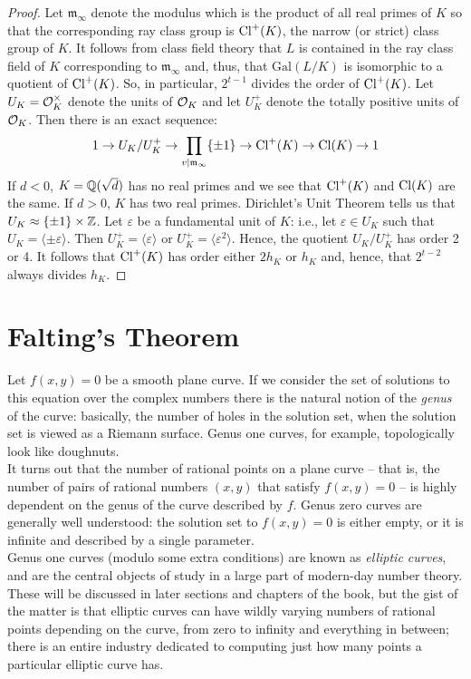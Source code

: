 \documentclass{book}
\begin{document}
\begin{proof}
Let $\mathfrak{m}_{\infty}$ denote the modulus which is the product of all
real primes of $K$ so that the corresponding ray class group is $\operatorname{Cl}^+(K)$,
the narrow (or strict) class group of $K$.  It follows from class field
theory that $L$ is contained in the ray class field of $K$ corresponding to
$\mathfrak{m}_\infty$ and, thus, that $\mathrm{Gal}(L/K)$ is isomorphic to a
quotient of $\operatorname{Cl}^+(K)$.  So, in particular, $2^{t-1}$ divides the order of
$\operatorname{Cl}^+(K)$.  Let $U_K = \mathcal{O}_K^\times$ denote the units of $\mathcal{O}_K$ and let
$U_K^+$ denote the totally positive units of $\mathcal{O}_K$.  Then there is an exact
sequence:
$$
1 \rightarrow U_K/U_K^+ \rightarrow \prod_{v|\mathfrak{m}_\infty} \{\pm 1\}
\rightarrow \operatorname{Cl}^+(K) \rightarrow \operatorname{Cl}(K) \rightarrow 1
$$
If $d < 0$, $K = \mathbb{Q}(\sqrt{d})$ has no real primes and we see that $\operatorname{Cl}^+(K)$
and $\operatorname{Cl}(K)$ are the same.  If $d > 0$, $K$ has two real primes.
Dirichlet's Unit Theorem tells us that $U_K \approx \{\pm 1\} \times \mathbb{Z}$.
Let $\varepsilon$ be a fundamental unit of $K$: i.e., let $\varepsilon \in
U_K$ such that $U_K = \langle\pm \varepsilon\rangle$.  Then $U_K^+ = \langle
\varepsilon\rangle$ or $U_K^+ = \langle\varepsilon^2\rangle$.  Hence, the
quotient $U_K/U_K^+$ has order 2 or 4.  It follows that $\operatorname{Cl}^+(K)$ has order
either $2h_K$ or $h_K$ and, hence, that $2^{t-2}$ always divides $h_K$.
\end{proof}

\section{Falting's Theorem}\label{sec:faltings}
Let $f(x,y)=0$ be a smooth plane curve. If we
consider the set of solutions to this equation over
the complex numbers there is the natural notion of
the {\it genus} of the curve: basically, the number
of holes in the solution set, when the solution set
is viewed as a Riemann surface. Genus one curves, for
example, topologically look like doughnuts. \\

It turns out that the number of rational points on a
plane curve -- that is, the number of pairs of
rational numbers $(x,y)$ that satisfy $f(x,y)=0$ --
is highly dependent on the genus of the curve
described by $f$. Genus zero curves are generally
well understood: the solution set to $f(x,y)=0$ is
either empty, or it is infinite and described by a
single parameter. \\

Genus one curves (modulo some extra conditions) are
known as {\it elliptic curves}, and are the central
objects of study in a large part of modern-day number
theory. These will be discussed in later sections and
chapters of the book, but the gist of the matter is
that elliptic curves can have wildly varying numbers
of rational points depending on the curve, from zero
to infinity and everything in between; there is an
entire industry dedicated to computing just how many
points a particular elliptic curve has. \\
\end{document}
